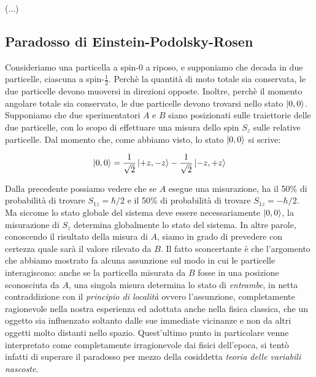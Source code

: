 (...)

\subsection{Paradosso di Einstein-Podolsky-Rosen}

	Consideriamo una particella a spin-0 a riposo, e supponiamo che decada in due particelle, ciascuna a spin-$\tfrac{1}{2}$. Perch\`e la quantit\`a di moto totale sia conservata, le due particelle devono muoversi in direzioni opposte. Inoltre, perch\`e il momento angolare totale sia conservato, le due particelle devono trovarsi nello stato $\ket{0, 0}$. Supponiamo che due sperimentatori $A$ e $B$ siano posizionati sulle traiettorie delle due particelle, con lo scopo di effettuare una misura dello spin $S_z$ sulle relative particelle.
Dal momento che, come abbiamo visto, lo stato $\ket{0, 0}$ si scrive:

	\[
		\ket{0, 0}  = \frac{1}{\sqrt{2}} \ket{+z, -z} - \frac{1}{\sqrt{2}} \ket{-z, +z}
	\]

Dalla precedente possiamo vedere che se $A$ esegue una misurazione, ha il 50\% di probabilit\`a di trovare $S_{1z} = \hbar / 2$ e il 50\% di probabilit\`a di trovare $S_{1z} = - \hbar / 2$. Ma siccome lo stato globale del sistema deve essere necessariamente $\ket{0, 0}$, la misurazione di $S_z$ determina globalmente lo stato del sistema. In altre parole, conoscendo il risultato della misura di $A$, siamo in grado di prevedere con certezza quale sar\`a il valore rilevato da $B$. Il fatto sconcertante \`e che l'argomento che abbiamo mostrato fa alcuna assunzione sul modo in cui le particelle interagiscono: anche se la particella misurata da $B$ fosse in una posizione sconosciuta da $A$, una singola misura determina lo stato di \textit{entrambe}, in netta contraddizione con il \textit{principio di localit\`a} ovvero l'assunzione, completamente ragionevole nella nostra esperienza ed adottata anche nella fisica classica, che un oggetto sia influenzato soltanto dalle sue immediate vicinanze e non da altri oggetti molto distanti nello spazio. 
Quest'ultimo punto in particolare venne interpretato come completamente irragionevole dai fisici dell'epoca, si tent\`o infatti di superare il paradosso per mezzo della cosiddetta \textit{teoria delle variabili nascoste}.

